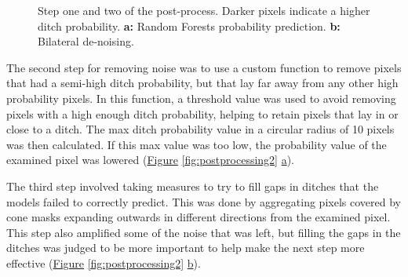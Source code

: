 \documentclass[]{interact}
\theoremstyle{plain}%
\theoremstyle{definition}
\theoremstyle{remark}
\begin{document}
\begin{figure} [!htb]
    \caption{Step one and two of the post-process. Darker pixels indicate a higher ditch probability. \textbf{a: }Random Forests probability prediction. \textbf{b: }Bilateral de-noising.}
    \label{fig:postprocessing1}
\end{figure}

The second step for removing noise was to use a custom function to remove pixels that had a semi-high ditch probability, but that lay far away from any other high probability pixels. In this function, a threshold value was used to avoid removing pixels with a high enough ditch probability, helping to retain pixels that lay in or close to a ditch. The max ditch probability value in a circular radius of 10 pixels was then calculated. If this max value was too low, the probability value of the examined pixel was lowered (\hyperref[fig:postprocessing2]{Figure} \ref{fig:postprocessing2} \hyperref[fig:postprocessing2]{a}).

The third step involved taking measures to try to fill gaps in ditches that the models failed to correctly predict. This was done by aggregating pixels covered by cone masks expanding outwards in different directions from the examined pixel. This step also amplified some of the noise that was left, but filling the gaps in the ditches was judged to be more important to help make the next step more effective (\hyperref[fig:postprocessing2]{Figure} \ref{fig:postprocessing2} \hyperref[fig:postprocessing2]{b}).
\end{document}
